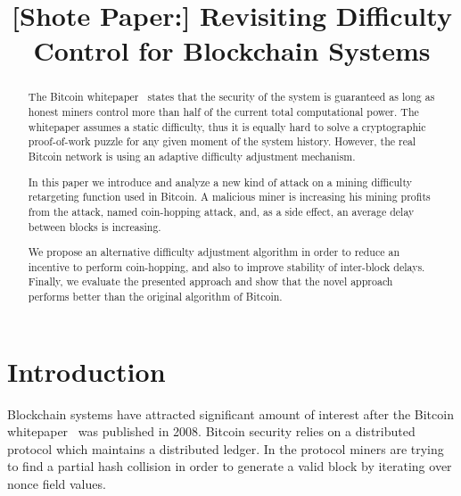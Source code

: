 \documentclass[]{llncs}
\newcommand{\block}{\mathcal{B}}
\begin{document}
\title{[Shote Paper:] Revisiting Difficulty Control for Blockchain Systems}




\maketitle

\begin{abstract}

The Bitcoin whitepaper~\cite{Nakamoto2008} states that the security of the system is guaranteed as long as honest miners control more than half of the current total computational power. The whitepaper assumes a static difficulty, thus it is equally hard to solve a cryptographic proof-of-work puzzle for any given moment of the system history. However, the real Bitcoin network is using an adaptive difficulty adjustment mechanism.  

In this paper we introduce and analyze a new kind of attack on a mining difficulty retargeting function used in Bitcoin. A malicious miner is increasing his mining profits from the attack, named coin-hopping attack, and, as a side effect, an average delay between blocks is increasing.

We propose an alternative difficulty adjustment algorithm in order to reduce an incentive to perform coin-hopping, and also to improve stability of inter-block delays. Finally, we evaluate the presented approach and show that the novel approach performs better than the original algorithm of Bitcoin.
	
\end{abstract}


\section{Introduction}
\label{sec:intro}

Blockchain systems have attracted significant amount of interest after the Bitcoin whitepaper~\cite{Nakamoto2008} was published in 2008.
Bitcoin security relies on a distributed protocol which maintains a distributed ledger. In the protocol miners are trying to find a partial hash collision in order to generate a valid block by iterating over nonce field values. 
\end{document}
